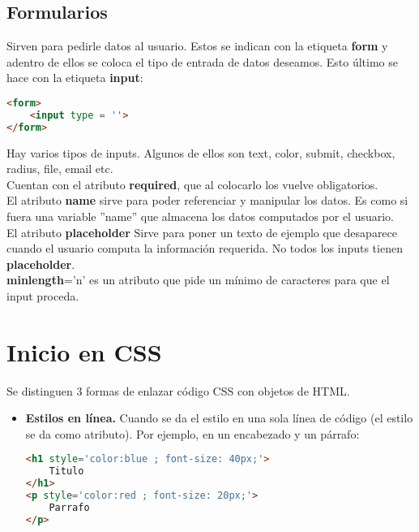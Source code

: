\documentclass[10pt,oneside]{article}
\begin{document}
\begin{multicols}{2}
\subsection{Formularios}

    Sirven para pedirle datos al usuario. Estos se indican con la etiqueta \textbf{form} y adentro de ellos se coloca el tipo de entrada de datos deseamos. Esto último se hace con la etiqueta \textbf{input}:

    \begin{lstlisting}[language=HTML]
<form>
    <input type = ''>
</form>
    \end{lstlisting}

    Hay varios tipos de inputs. Algunos de ellos son text, color, submit, checkbox, radius, file, email etc. \\ \newline Cuentan con el atributo \textbf{required}, que al colocarlo los vuelve obligatorios. \\ \newline El atributo \textbf{name} sirve para poder referenciar y manipular los datos. Es como si fuera una variable ''name'' que almacena los datos computados por el usuario.\\ \newline El atributo \textbf{placeholder} Sirve para poner un texto de ejemplo que desaparece cuando el usuario computa la información requerida. No todos los inputs tienen \textbf{placeholder}.\\\newline \textbf{minlength}='n' es un atributo que pide un mínimo de caracteres para que el input proceda. 
    
\section{Inicio en CSS} 

    Se distinguen 3 formas de enlazar código CSS con objetos de HTML. 
    \begin{itemize}
        \item \textbf{Estilos en línea.} Cuando se da el estilo en una sola línea de código (el estilo se da como atributo). Por ejemplo, en un encabezado y un párrafo:

        \begin{lstlisting}[language=HTML]
<h1 style='color:blue ; font-size: 40px;'>
    Titulo
</h1>
<p style='color:red ; font-size: 20px;'>  
    Parrafo
</p>
        \end{lstlisting}


\end{itemize}
\end{multicols}
\end{document}
